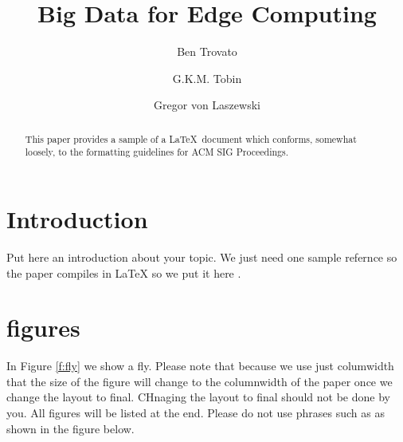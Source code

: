\title{Big Data for Edge Computing}


\author{Ben Trovato}

\author{G.K.M. Tobin}

\author{Gregor von Laszewski}


\renewcommand{\shortauthors}{G. v. Laszewski}


\begin{abstract}
This paper provides a sample of a \LaTeX\ document which conforms,
somewhat loosely, to the formatting guidelines for
ACM SIG Proceedings.
\end{abstract}



\maketitle



\section{Introduction}

Put here an introduction about your topic. 
We just need one sample refernce so the paper compiles in LaTeX so we
put it here \cite{editor00}.

\section{figures}

In Figure \ref{f:fly} we show a fly. Please note that because we use
just columwidth that the size of the figure will change to the
columnwidth of the paper once we change the layout to final. CHnaging
the layout to final should not be done by you. All figures will be
listed at the end. Please do not use phrases such as as shown in the
figure below.

